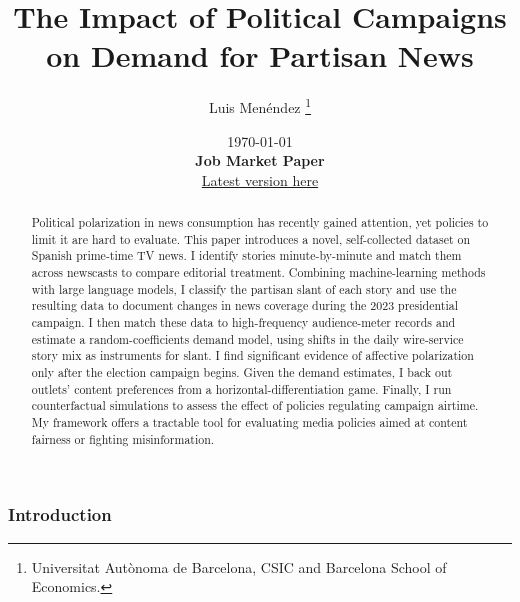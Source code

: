 \documentclass[12pt]{article}
\title{The Impact of Political Campaigns on Demand for Partisan News}
\author{Luis  Menéndez \thanks{Universitat Autònoma de Barcelona, CSIC and Barcelona School of Economics.}} %
\date{%
	\today\\[2ex]
	{\bfseries Job Market Paper}\\[1ex]
	{\normalsize\href{https://www.dropbox.com/scl/fi/f3546vufz11vj5r63xml4/elections_draft.pdf?rlkey=exjw9vm3sasahlb54ohjf2tyx\&e=1\&dl=0}{Latest version here}}
}
\renewcommand\thepart{}      %
\renewcommand\partname{}      %
\begin{document}
	
\renewcommand\thepart{}      %
\renewcommand\partname{}      %
	
	
	\maketitle
	
	\begin{abstract}
		

	
		Political polarization in news consumption has recently gained attention, yet policies to limit it are hard to evaluate. This paper introduces a novel, self-collected dataset on Spanish prime-time TV news. I identify stories minute-by-minute and match them across newscasts to compare editorial treatment. Combining machine-learning methods with large language models, I classify the partisan slant of each story and use the resulting data to document changes in news coverage during the 2023 presidential campaign. I then match these data to high-frequency audience-meter records and estimate a random-coefficients demand model, using shifts in the daily wire-service story mix as instruments for slant. I find significant evidence of affective polarization only after the election campaign begins. Given the demand estimates, I back out outlets’ content preferences from a horizontal-differentiation game. Finally, I run counterfactual simulations to assess the effect of policies regulating campaign airtime. My framework offers a tractable tool for evaluating media policies aimed at content fairness or fighting misinformation.
		
		
		
	\end{abstract}
	
	


		\doparttoc %
	\faketableofcontents %
		\part{} %
		
	
	\clearpage
	

	
	

	

	
	
	\section{Introduction}
	
\end{document}
